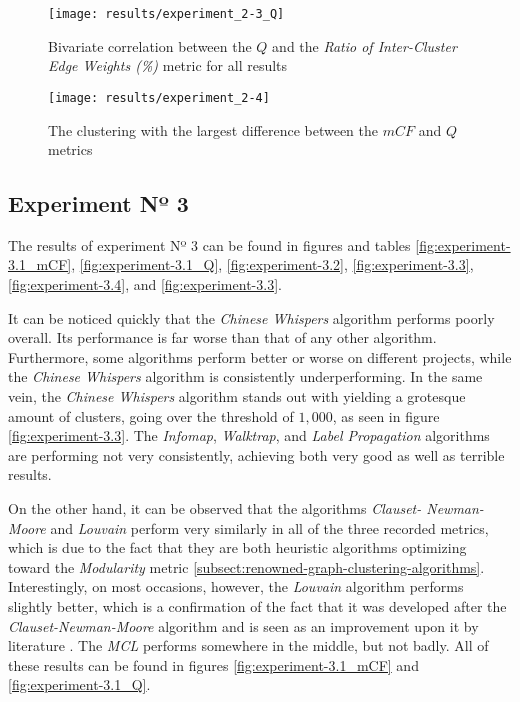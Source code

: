\documentclass[12pt,a4paper]{report}
\begin{document}
\begin{figure}[htbp]
\centering
\texttt{[image: results/experiment\_2-3\_Q]}
\caption{Bivariate correlation between the $Q$ and the \textit{Ratio of Inter-Cluster Edge Weights (\%)} metric for all results}
\label{fig:experiment-2.3_Q}
\end{figure}

\begin{figure}[htbp]
\centering
\texttt{[image: results/experiment\_2-4]}
\caption{The clustering with the largest difference between the $mCF$ and $Q$ metrics}
\label{fig:experiment-2.4}
\end{figure}


\subsection{Experiment Nº 3}

The results of experiment Nº 3 can be found in figures and tables
\ref{fig:experiment-3.1_mCF}, \ref{fig:experiment-3.1_Q}, \ref{fig:experiment-3.2},
\ref{fig:experiment-3.3}, \ref{fig:experiment-3.4}, and \ref{fig:experiment-3.3}.

It can be noticed quickly that the \textit{Chinese Whispers} algorithm performs
poorly overall. Its performance is far worse than that of any other algorithm.
Furthermore, some algorithms perform better or worse on different projects,
while the \textit{Chinese Whispers} algorithm is consistently underperforming.
In the same vein, the \textit{Chinese Whispers} algorithm stands out with
yielding a grotesque amount of clusters, going over the threshold of $1,000$,
as seen in figure \ref{fig:experiment-3.3}. The \textit{Infomap},
\textit{Walktrap}, and \textit{Label Propagation} algorithms are performing not
very consistently, achieving both very good as well as terrible results.

On the other hand, it can be observed that the algorithms \textit{Clauset\hyp
Newman-Moore} and \textit{Louvain} perform very similarly in all of the three
recorded metrics, which is due to the fact that they are both heuristic
algorithms optimizing toward the \textit{Modularity} metric
\ref{subsect:renowned-graph-clustering-algorithms}. Interestingly, on most occasions,
however, the \textit{Louvain} algorithm performs slightly better, which is a
confirmation of the fact that it was developed after the \textit{Clauset-Newman-Moore}
algorithm and is seen as an improvement upon it by literature
\cite{lancichinetti2009community}. The \textit{MCL} performs somewhere in the middle,
but not badly. All of these results can be found in figures
\ref{fig:experiment-3.1_mCF} and \ref{fig:experiment-3.1_Q}.
\end{document}
